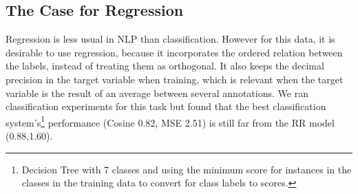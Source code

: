 \documentclass[11pt,letterpaper]{article}
\begin{document}
\subsection{The Case for Regression} 
\label{subsec:forregression}
Regression is less usual in NLP than classification. %
However for this data, it is desirable to use regression, because 
it incorporates the ordered relation between the labels, instead of treating them as orthogonal. It also keeps the decimal precision in the target variable when training, which is relevant when the target variable is the result of an average between several annotations. %
We ran classification experiments for this task but found that the best classification system's\footnote{Decision Tree with 7 classes and using the minimum score for instances in the classes in the training data to convert for class labels to scores.}  %
performance (Cosine 0.82, MSE 2.51) is still far from the {\sc RR} model (0.88,1.60). 

%
%
\end{document}
